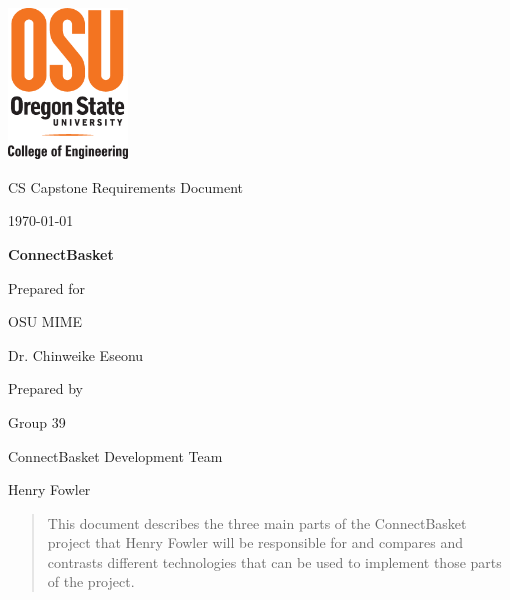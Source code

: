 \documentclass[onecolumn, draftclsnofoot,10pt, compsoc]{IEEEtran}
\def \CapstoneTeamName{		ConnectBasket Development Team}
\def \CapstoneTeamNumber{		39}
\def \GroupMemberOne{			Henry Fowler}
\def \CapstoneProjectName{		ConnectBasket}
\def \CapstoneSponsorCompany{	OSU MIME}
\def \CapstoneSponsorPerson{		Dr. Chinweike Eseonu}
\def \DocType{		%
				Requirements Document
				}
\newcommand{\NameSigPair}[1]{\par
\makebox[2.75in][r]{#1} \hfil 	\makebox[3.25in]{\makebox[2.25in]{\hrulefill} \hfill		\makebox[.75in]{\hrulefill}}
\par\vspace{-12pt} \textit{\tiny\noindent
\makebox[2.75in]{} \hfil		\makebox[3.25in]{\makebox[2.25in][r]{Signature} \hfill	\makebox[.75in][r]{Date}}}}
\renewcommand{\NameSigPair}[1]{#1}
\begin{document}
\begin{titlepage}
    \begin{singlespace}
    	\includegraphics[height=4cm]{coe_v_spot1}
        \hfill 
        \par\vspace{.2in}
        \centering
        \scshape{
            \huge CS Capstone \DocType \par
            {\large\today}\par
            \vspace{.5in}
            \textbf{\Huge\CapstoneProjectName}\par
            \vfill
            {\large Prepared for}\par
            \Huge \CapstoneSponsorCompany\par
            \vspace{5pt}
            {\Large\NameSigPair{\CapstoneSponsorPerson}\par}
            {\large Prepared by }\par
            Group\CapstoneTeamNumber\par
            \CapstoneTeamName\par 
            \vspace{5pt}
            {\Large
                \NameSigPair{\GroupMemberOne}\par
            }
            \vspace{20pt}
        }
        \begin{abstract}
        This document describes the three main parts of the ConnectBasket project that Henry Fowler will be responsible for and compares and contrasts different technologies that can be used to implement those parts of the project.
        \end{abstract}     
    \end{singlespace}
\end{titlepage}
\newpage
{}
\tableofcontents
\clearpage
\end{document}
